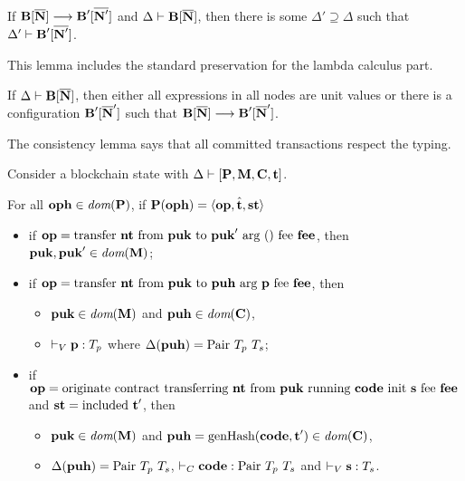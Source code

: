 \documentclass[runningheads]{llncs}
\begin{document}
\begin{lemma}[Preservation]
  If $\BLOCKCHAIN[\overline\NODE] \SystemTrans{} \BLOCKCHAIN'[\overline{\NODE'}]$ and
  $\JTypeConfig\Delta {\BLOCKCHAIN[\overline\NODE]}$, then there is some
  $\Delta' \supseteq \Delta$ such that
  $\JTypeConfig{\Delta'}{ \BLOCKCHAIN'[\overline{\NODE'}]}$.
\end{lemma}
This lemma includes the standard preservation for the lambda calculus part.
\begin{lemma}[Progress]
  If $\JTypeConfig\Delta{\BLOCKCHAIN[\overline\NODE]}$, then either
  all expressions in all nodes are unit values or there is a
  configuration $\BLOCKCHAIN'[\overline\NODE']$ such that
  $\BLOCKCHAIN[\overline\NODE] \SystemTrans \BLOCKCHAIN'[\overline\NODE']$.
\end{lemma}
The consistency lemma says that all committed transactions respect the
typing.
\begin{lemma}[Consistency]
Consider a blockchain state with $\JTypeBlockchain\Delta {[\PENDING, \MANAGERS, \CONTRACTORS,
\TIME]}$.

For all $\OPH\in\DOM (\PENDING)$,
if  $\PENDING (\OPH) =  \Angle{\OP, \hat\TIME, \STATUS}$
\begin{itemize}
\item if $\OP = \TRANSFER\NTEZ\PUK{\PUK'}\MTEZ$, then
  $\PUK, \PUK' \in \DOM (\MANAGERS)$;
\item if $\OP = \TRANSFER[\PARAMETER]\NTEZ\PUK\PUH\MTEZ$, then
  \begin{itemize}
  \item $\PUK \in \DOM (\MANAGERS)$ and $\PUH\in\DOM (\CONTRACTORS)$,
  \item $\JTypeValue\PARAMETER{ \TYPE_p}$ where $\Delta (\PUH)  =\TPAIR\ \TYPE_p\ \TYPE_s$;
  \end{itemize}
\item if $\OP = \ORIGINATE\NTEZ\PUK\CODE\STRING\MTEZ$ and $\STATUS =
  \STATUSINCLUDED\ \TIME'$, then
  \begin{itemize}
  \item $\PUK \in \DOM (\MANAGERS)$ and  $\PUH =\GENERATEHASH (\CODE, \TIME') \in \DOM (\CONTRACTORS)$,
  \item $\Delta (\PUH)  =\TPAIR\ \TYPE_p\ \TYPE_s$,  $\JTypeCode\CODE{
      \TPAIR\ \TYPE_p\ \TYPE_s}$ and $\JTypeValue\STRING{ \TYPE_s}$.
  \end{itemize}
\end{itemize}
\end{lemma}
\end{document}
